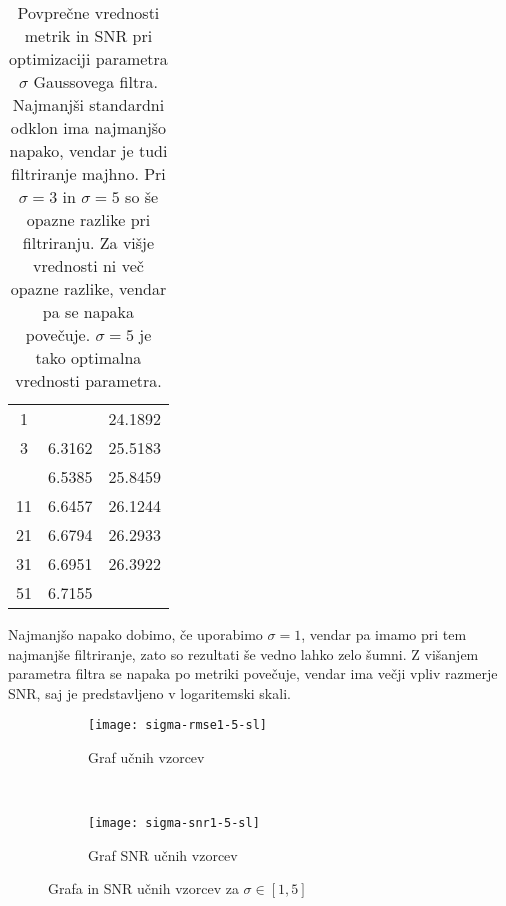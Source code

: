\begin{table}[!htb]
	\centering
	\begin{tabular}{S[table-format=2.0, round-mode=places, round-precision=2] S[table-format=1.2, round-mode=places, round-precision=2] S[table-format=2.2, round-mode=places, round-precision=2]}
		\toprule
		\theadm{\sigma} & \thead{\rmse} &   \\
		 &  & 24.1892\\
		3 & 6.3162 & 25.5183\\
		 & 6.5385 & 25.8459\\
		11 & 6.6457 & 26.1244\\
		21 & 6.6794 & 26.2933\\
		31 & 6.6951 & 26.3922\\
		51 & 6.7155 & \\
		\bottomrule
	\end{tabular}
	\caption[Metrike pri optimizaciji Gaussovega filtra]{Povprečne vrednosti metrik \rmse in SNR pri optimizaciji parametra $\sigma$ Gaussovega filtra. Najmanjši standardni odklon ima najmanjšo napako, vendar je tudi filtriranje majhno. Pri $\sigma=3$ in $\sigma=5$ so še opazne razlike pri filtriranju. Za višje vrednosti ni več opazne razlike, vendar pa se napaka povečuje. $\sigma=5$ je tako optimalna vrednosti parametra.}
	\label{tab:gauss}
\end{table}

Najmanjšo napako dobimo, če uporabimo $\sigma=1$, vendar pa imamo pri tem najmanjše filtriranje, zato so rezultati še vedno lahko zelo šumni. Z višanjem parametra filtra se napaka po metriki \rmse povečuje, vendar ima večji vpliv razmerje SNR, saj je predstavljeno v logaritemski skali. 

\begin{figure}[!htb]
	\centering
	\begin{subfigure}[t]{0.45\columnwidth}
		\texttt{[image: sigma-rmse1-5-sl]}
		\caption{Graf \rmse  učnih vzorcev }
		\label{fig:sigma-rmse1-5}
	\end{subfigure}
	~
	\begin{subfigure}[t]{0.45\columnwidth}
		\texttt{[image: sigma-snr1-5-sl]}
		\caption{Graf SNR  učnih vzorcev}
		\label{fig:sigma-snr1-5}
	\end{subfigure}
	\caption{Grafa \rmse in SNR učnih vzorcev za \mbox{$\sigma \in [1,5]$}}
	\label{fig:sigma1-5}
\end{figure}

